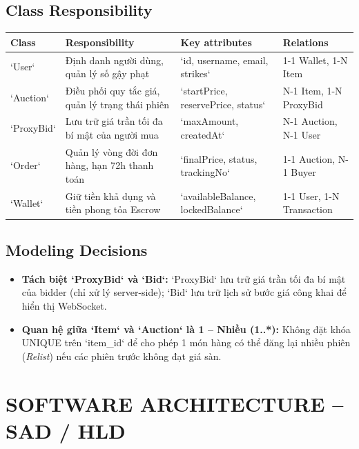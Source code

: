 \documentclass[11pt,a4paper]{article}
\begin{document}
\subsection{Class Responsibility}
\begin{table}[H]
    \centering
    \small
    \begin{tabularx}{\textwidth}{|l|X|l|l|}
        \hline
        \textbf{Class} & \textbf{Responsibility} & \textbf{Key attributes} & \textbf{Relations} \\ \hline
        `User` & Định danh người dùng, quản lý số gậy phạt & `id, username, email, strikes` & 1-1 Wallet, 1-N Item \\ \hline
        `Auction` & Điều phối quy tắc giá, quản lý trạng thái phiên & `startPrice, reservePrice, status` & N-1 Item, 1-N ProxyBid \\ \hline
        `ProxyBid` & Lưu trữ giá trần tối đa bí mật của người mua & `maxAmount, createdAt` & N-1 Auction, N-1 User \\ \hline
        `Order` & Quản lý vòng đời đơn hàng, hạn 72h thanh toán & `finalPrice, status, trackingNo` & 1-1 Auction, N-1 Buyer \\ \hline
        `Wallet` & Giữ tiền khả dụng và tiền phong tỏa Escrow & `availableBalance, lockedBalance` & 1-1 User, 1-N Transaction \\ \hline
    \end{tabularx}
\end{table}

\subsection{Modeling Decisions}
\begin{itemize}[leftmargin=*]
    \item \textbf{Tách biệt `ProxyBid` và `Bid`:} `ProxyBid` lưu trữ giá trần tối đa bí mật của bidder (chỉ xử lý server-side); `Bid` lưu trữ lịch sử bước giá công khai để hiển thị WebSocket.
    \item \textbf{Quan hệ giữa `Item` và `Auction` là 1 -- Nhiều (1..*):} Không đặt khóa UNIQUE trên `item_id` để cho phép 1 món hàng có thể đăng lại nhiều phiên (\textit{Relist}) nếu các phiên trước không đạt giá sàn.
\end{itemize}

\section{SOFTWARE ARCHITECTURE -- SAD / HLD}
\end{document}

